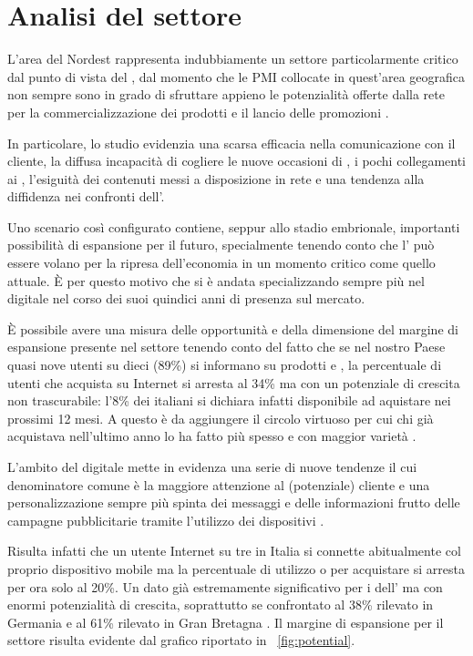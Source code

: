 \section{Analisi del settore}
L'area del Nordest rappresenta indubbiamente un settore particolarmente critico dal punto di vista del \mktg {}, dal momento che le PMI collocate in quest'area geografica non sempre sono in grado di sfruttare appieno le potenzialità offerte dalla rete per la commercializzazione dei prodotti e il lancio delle promozioni \cite[\itshape{}pag. 6 e succ.]{bassi:pmi}.

In particolare, lo studio evidenzia una scarsa efficacia nella comunicazione con il cliente, la diffusa incapacità di cogliere le nuove occasioni di \bsn, i pochi collegamenti ai , l'esiguità dei contenuti messi a disposizione in rete e una tendenza alla diffidenza nei confronti dell'.

Uno scenario così configurato contiene, seppur allo stadio embrionale, importanti possibilità di espansione per il futuro, specialmente tenendo conto che l' può essere volano per la ripresa dell'economia in un momento critico come quello attuale. È per questo motivo che \customer si è andata specializzando sempre più nel \mktg digitale nel corso dei suoi quindici anni di presenza sul mercato.

È possibile avere una misura delle opportunità e della dimensione del margine di espansione presente nel settore tenendo conto del fatto che se nel nostro Paese quasi nove utenti su dieci (89\%) si informano  su prodotti e , la percentuale di utenti che acquista su Internet si  arresta al 34\% ma con un potenziale di crescita non trascurabile: l'8\% dei  italiani si dichiara infatti disponibile ad aquistare  nei prossimi 12 mesi. A questo è da aggiungere il circolo virtuoso per
cui chi già acquistava nell’ultimo anno lo ha fatto più spesso e con maggior varietà \cite[\textit{pag.~3}]{contactlab:ecommerce}.

L'ambito del \mktg digitale mette in evidenza una serie di nuove tendenze il cui denominatore comune è la maggiore attenzione al (potenziale) cliente e una personalizzazione sempre più spinta dei messaggi e delle informazioni frutto delle campagne pubblicitarie tramite l'utilizzo dei dispositivi .

Risulta infatti che un utente Internet su tre in Italia si connette abitualmente col proprio dispositivo mobile ma la percentuale di utilizzo  o  per acquistare  si arresta per ora solo al 20\%. Un dato già estremamente significativo per i  dell' ma con enormi potenzialità di crescita, soprattutto se confrontato al 38\% rilevato in Germania e al 61\% rilevato in Gran Bretagna \cite{contactlab:ecommerce}. Il margine di espansione per il settore risulta evidente dal grafico riportato in \figurename~\ref{fig:potential}.


